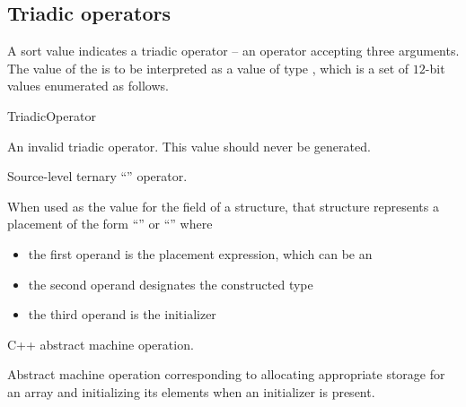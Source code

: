 \subsection{Triadic operators}
\label{sec:ifc:OperatorSort:Triadic}

A sort value  indicates a triadic operator -- 
an operator accepting three arguments.  The
value of the  is to be interpreted as a value of type 
, which is a set of $12$-bit values enumerated as follows.
%
\begin{Enumeration}{TriadicOperator}

	\setcounter{enumi}{1023}
	\setcounter{enumi}{4063}
\end{Enumeration}

An invalid triadic operator.  This value should never be generated.

Source-level ternary ``'' operator.


When used as the value for the  field of a  structure, that structure
represents a placement  of the form ``'' or ``'' 
 where
\begin{itemize}
	\item the first operand is the placement expression, which can be an  
	\item the second operand designates the constructed type
	\item the third operand is the initializer
\end{itemize}




C++ abstract machine operation.

Abstract machine operation corresponding to allocating appropriate storage for an array and initializing its elements
when an initializer is present.

